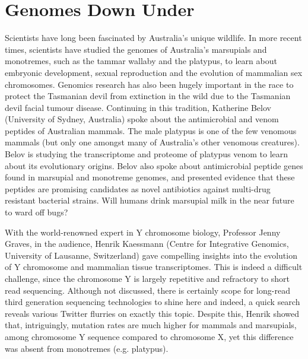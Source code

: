 \documentclass[twocolumn]{bmcart}%
\begin{document}
%

\section*{Genomes Down Under}
Scientists have long been fascinated by Australia's unique wildlife. In more recent times, scientists have studied the genomes of Australia's marsupials and monotremes, such as the tammar wallaby and the platypus, to learn about embryonic development, sexual reproduction and the evolution of mammalian sex chromosomes. Genomics research has also been hugely important in the race to protect the Tasmanian devil from extinction in the wild due to the Tasmanian devil facial tumour disease. Continuing in this tradition, Katherine Belov (University of Sydney, Australia) spoke about the antimicrobial and venom peptides of Australian mammals. The male platypus is one of the few venomous mammals (but only one amongst many of Australia's other venomous creatures). Belov is studying the transcriptome and proteome of platypus venom to learn about its evolutionary origins. Belov also spoke about antimicrobial peptide genes found in marsupial and monotreme genomes, and presented evidence that these peptides are promising candidates as novel antibiotics against multi-drug resistant bacterial strains.  Will humans drink marsupial milk in the near future to ward off bugs?

With the world-renowned expert in Y chromosome biology, Professor Jenny Graves, in the audience, Henrik Kaessmann (Centre for Integrative Genomics, University of Lausanne, Switzerland) gave compelling insights into the evolution of Y chromosome and mammalian tissue transcriptomes.  This is indeed a difficult challenge, since the chromosome Y is largely repetitive and refractory to short read sequencing. Although not discussed, there is certainly scope for long-read third generation sequencing technologies to shine here and indeed, a quick search reveals various Twitter flurries on exactly this topic.  Despite this, Henrik showed that, intriguingly, mutation rates are much higher for mammals and marsupials, among chromosome Y sequence compared to chromosome X, yet this difference was absent from monotremes (e.g. platypus).
\end{document}
